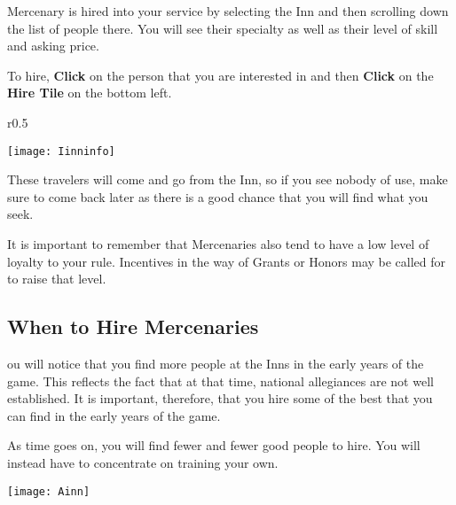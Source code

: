  Mercenary is hired into your service by selecting the Inn and then scrolling down the list of people there. You will see their specialty as well as their level of skill and asking price.

To hire, \textbf{Click} on the person that you are interested in and then \textbf{Click} on the \textbf{Hire Tile} on the bottom left.

\clearpage


\begin{wrapfigure}{r}{0.5\textwidth}
    \vspace{-20pt}
    \begin{center}
        \texttt{[image: Iinninfo]} %
    \end{center}
    \vspace{-20pt}
\end{wrapfigure}

These travelers will come and go from the Inn, so if you see nobody of use, make sure to come back later as there is a good chance that you will find what you seek.

It is important to remember that Mercenaries also tend to have a low level of loyalty to your rule. Incentives in the way of Grants or Honors may be called for to raise that level.

\subsection{When to Hire Mercenaries}

ou will notice that you find more people at the Inns in the early years of the game. This reflects the fact that at that time, national allegiances are not well established. It is important, therefore, that you hire some of the best that you can find in the early years of the game.

As time goes on, you will find fewer and fewer good people to hire. You will instead have to concentrate on training your own.

\begin{center}
    \texttt{[image: Ainn]} %
\end{center}